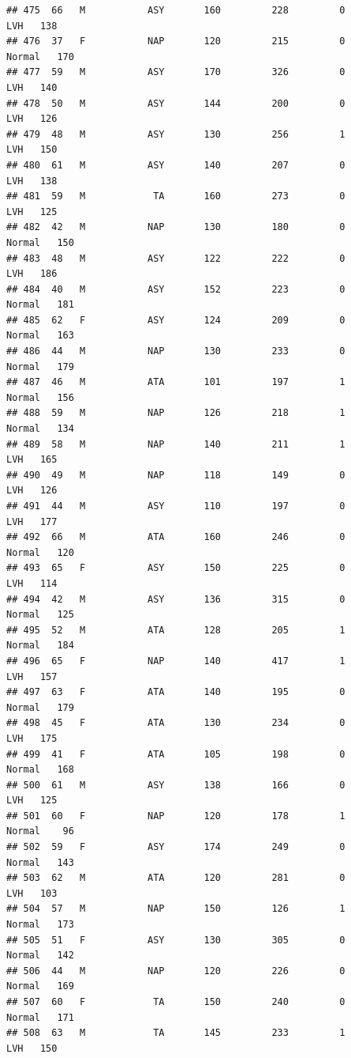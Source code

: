 \documentclass[
]{article}
\begin{document}
\begin{verbatim}
## 475  66   M           ASY       160         228         0        LVH   138
## 476  37   F           NAP       120         215         0     Normal   170
## 477  59   M           ASY       170         326         0        LVH   140
## 478  50   M           ASY       144         200         0        LVH   126
## 479  48   M           ASY       130         256         1        LVH   150
## 480  61   M           ASY       140         207         0        LVH   138
## 481  59   M            TA       160         273         0        LVH   125
## 482  42   M           NAP       130         180         0     Normal   150
## 483  48   M           ASY       122         222         0        LVH   186
## 484  40   M           ASY       152         223         0     Normal   181
## 485  62   F           ASY       124         209         0     Normal   163
## 486  44   M           NAP       130         233         0     Normal   179
## 487  46   M           ATA       101         197         1     Normal   156
## 488  59   M           NAP       126         218         1     Normal   134
## 489  58   M           NAP       140         211         1        LVH   165
## 490  49   M           NAP       118         149         0        LVH   126
## 491  44   M           ASY       110         197         0        LVH   177
## 492  66   M           ATA       160         246         0     Normal   120
## 493  65   F           ASY       150         225         0        LVH   114
## 494  42   M           ASY       136         315         0     Normal   125
## 495  52   M           ATA       128         205         1     Normal   184
## 496  65   F           NAP       140         417         1        LVH   157
## 497  63   F           ATA       140         195         0     Normal   179
## 498  45   F           ATA       130         234         0        LVH   175
## 499  41   F           ATA       105         198         0     Normal   168
## 500  61   M           ASY       138         166         0        LVH   125
## 501  60   F           NAP       120         178         1     Normal    96
## 502  59   F           ASY       174         249         0     Normal   143
## 503  62   M           ATA       120         281         0        LVH   103
## 504  57   M           NAP       150         126         1     Normal   173
## 505  51   F           ASY       130         305         0     Normal   142
## 506  44   M           NAP       120         226         0     Normal   169
## 507  60   F            TA       150         240         0     Normal   171
## 508  63   M            TA       145         233         1        LVH   150

\end{verbatim}
\end{document}
